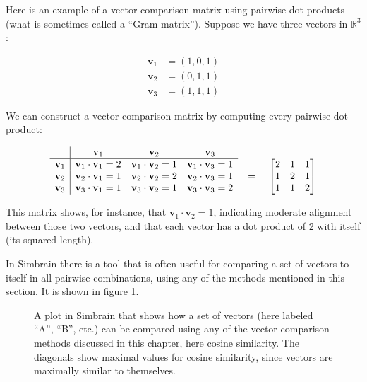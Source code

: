 Here is an example of a vector comparison matrix using pairwise dot products (what is sometimes called a ``Gram matrix''). Suppose we have three vectors in \( \mathbb{R}^3 \):

\begin{align*}
\mathbf{v}_1 &= (1,0,1) \\
\mathbf{v}_2 &= (0,1,1) \\
\mathbf{v}_3 &= (1,1,1)
\end{align*}

We can construct a vector comparison matrix by computing every pairwise dot product:

\[
\begin{array}{c|ccc}
 & \mathbf{v}_1 & \mathbf{v}_2 & \mathbf{v}_3 \\
\hline
\mathbf{v}_1 & \mathbf{v}_1 \cdot \mathbf{v}_1 = 2 & \mathbf{v}_1 \cdot \mathbf{v}_2 = 1 & \mathbf{v}_1 \cdot \mathbf{v}_3 = 1 \\
\mathbf{v}_2 & \mathbf{v}_2 \cdot \mathbf{v}_1 = 1 & \mathbf{v}_2 \cdot \mathbf{v}_2 = 2 & \mathbf{v}_2 \cdot \mathbf{v}_3 = 1 \\
\mathbf{v}_3 & \mathbf{v}_3 \cdot \mathbf{v}_1 = 1 & \mathbf{v}_3 \cdot \mathbf{v}_2 = 1 & \mathbf{v}_3 \cdot \mathbf{v}_3 = 2 \\
\end{array}
\raisebox{-0.3\height}{%
\quad = \quad
$\begin{bmatrix}
2 & 1 & 1 \\
1 & 2 & 1 \\
1 & 1 & 2 \\
\end{bmatrix}$}
\]

This matrix shows, for instance, that \( \mathbf{v}_1 \cdot \mathbf{v}_2 = 1 \), indicating 
moderate alignment between those two vectors, and that each vector has a dot product of 2 
with itself (its squared length).

In Simbrain there is a tool that is often useful for comparing a set of vectors to itself in all pairwise combinations, using any of the  methods mentioned in this section. It is shown in figure \ref{corrPlot}.

\begin{figure}[h]
\centering
{}
\caption[Simbrain screenshot from Jeff Yoshimi.]{A plot in Simbrain that shows how a set of vectors (here labeled ``A'', ``B'', etc.) can be compared using any of the vector comparison methods discussed in this chapter, here cosine similarity. The diagonals show maximal values for cosine similarity, since vectors are maximally similar to themselves.}
\label{corrPlot}
\end{figure}

